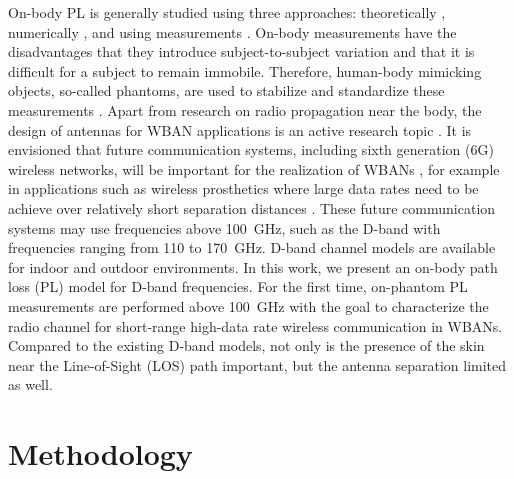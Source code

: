 \documentclass[preprint]{rsl}
\begin{document}
On-body PL is generally studied using three approaches: theoretically \cite{Chahat2013,Petrillo2014}, numerically \cite{Reusens2009}, and using measurements \cite{Chahat2013,Reusens2009,Aminzadeh2021_tap}. 
On-body measurements have the disadvantages that they introduce subject-to-subject variation \cite{Proesmans2022} and that it is difficult for a subject to remain immobile. 
Therefore, human-body mimicking objects, so-called phantoms, are used to stabilize and standardize these measurements \cite{Chahat2013}. 
Apart from research on radio propagation near the body, the design of antennas for WBAN applications is an active research topic \cite{Zhang2021,Mahmood2020,Hong2016,Tak2016,Verbiest2006}.
It is envisioned that future communication systems, including sixth generation (6G) wireless networks, will be important for the realization of WBANs \cite{Cornet2022}, for example in applications such as wireless prosthetics where large data rates need to be achieve over relatively short separation distances \cite{Proesmans2022}.
These future communication systems may use frequencies above 100~GHz, such as the D-band with frequencies ranging from 110 to 170~GHz.
D-band channel models are available for indoor \cite{DeBeelde2021_access, Pometcu2020} and outdoor \cite{DeBeelde2022_tap,DeBeelde2022_wcl} environments. 
In this work, we present an on-body path loss (PL) model for D-band frequencies. 
For the first time, on-phantom PL measurements are performed above 100~GHz with the goal to characterize the radio channel for short-range high-data rate wireless communication in WBANs.
Compared to the existing D-band models, not only is the presence of the skin near the Line-of-Sight (LOS) path important, but the antenna separation limited as well. 



\section{Methodology \label{sect:method}}
\end{document}

